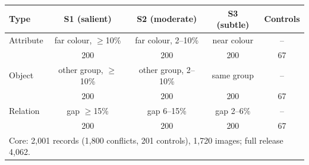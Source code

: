 \begin{tabular}{lcccc}
\toprule
Type & S1 (salient) & S2 (moderate) & S3 (subtle) & Controls \\
\midrule
Attribute & far colour, $\geq$10\% & far colour, 2--10\% & near colour & -- \\
 & 200 & 200 & 200 & 67 \\
Object & other group, $\geq$10\% & other group, 2--10\% & same group & -- \\
 & 200 & 200 & 200 & 67 \\
Relation & gap $\geq$15\% & gap 6--15\% & gap 2--6\% & -- \\
 & 200 & 200 & 200 & 67 \\
\midrule
\multicolumn{5}{l}{Core: 2,001 records (1,800 conflicts, 201 controls), 1,720 images; full release 4,062.} \\
\bottomrule
\end{tabular}
